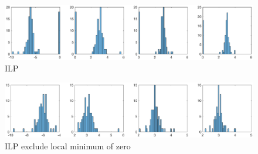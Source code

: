 \documentclass[12pt]{article}
\theoremstyle{plain} \newtheorem{theorem}{Theorem}
\theoremstyle{definition} \newtheorem{definition}{Definition}
\begin{document}
\begin{figure}[hp]
    \centering
    \includegraphics[width=1.2\textwidth]{figures/ilp-allrep.eps}
    \caption{ILP}
    \label{fig:ilp-allrep}
\end{figure}

\begin{figure}[hp]
    \centering
    \includegraphics[width=1.2\textwidth]{figures/ilp-exzero.eps}
    \caption{ILP exclude local minimum of zero}
    \label{fig:ilp-exzero}
\end{figure}
\end{document}

